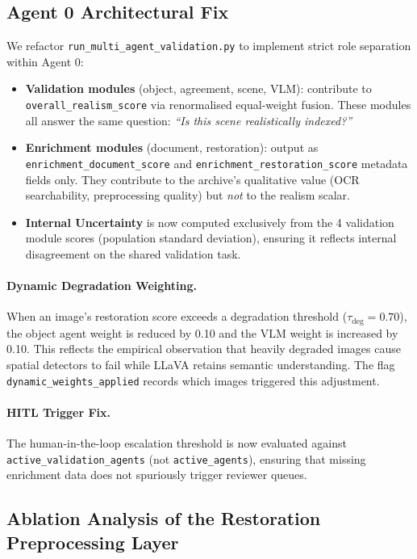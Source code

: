 \documentclass[12pt,onecolumn,a4paper]{IEEEtran}
\begin{document}
\subsection{Agent 0 Architectural Fix}

We refactor \texttt{run\_multi\_agent\_validation.py} to implement strict role separation within Agent 0:

\begin{itemize}
  \item \textbf{Validation modules} (object, agreement, scene, VLM): contribute to \texttt{overall\_realism\_score} via renormalised equal-weight fusion. These modules all answer the same question: \textit{``Is this scene realistically indexed?''}
  \item \textbf{Enrichment modules} (document, restoration): output as \texttt{enrichment\_document\_score} and \texttt{enrichment\_restoration\_score} metadata fields only. They contribute to the archive's qualitative value (OCR searchability, preprocessing quality) but \textit{not} to the realism scalar.
  \item \textbf{Internal Uncertainty} is now computed exclusively from the 4 validation module scores (population standard deviation), ensuring it reflects internal disagreement on the shared validation task.
\end{itemize}

\paragraph{Dynamic Degradation Weighting.}
When an image's restoration score exceeds a degradation threshold ($\tau_{\text{deg}} = 0.70$), the object agent weight is reduced by 0.10 and the VLM weight is increased by 0.10. This reflects the empirical observation that heavily degraded images cause spatial detectors to fail while LLaVA retains semantic understanding. The flag \texttt{dynamic\_weights\_applied} records which images triggered this adjustment.

\paragraph{HITL Trigger Fix.}
The human-in-the-loop escalation threshold is now evaluated against \texttt{active\_validation\_agents} (not \texttt{active\_agents}), ensuring that missing enrichment data does not spuriously trigger reviewer queues.

\subsection{Ablation Analysis of the Restoration Preprocessing Layer}
\label{sec:restoration_ablation}
\end{document}
